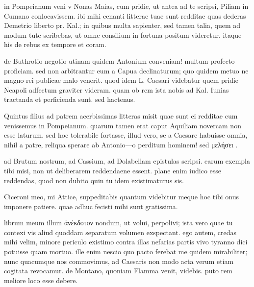 


 in Pompeianum veni v Nonas Maias, cum pridie, ut antea ad te scripsi, Piliam in Cumano conlocavissem. ibi mihi cenanti litterae tuae sunt redditae quas dederas Demetrio liberto pr. Kal.; in quibus multa sapienter, sed tamen talia, quem ad modum tute scribebas, ut omne consilium in fortuna positum videretur. itaque his de rebus ex tempore et coram.

 de Buthrotio negotio utinam quidem Antonium conveniam! multum profecto proficiam. sed non arbitrantur eum a Capua declinaturum; quo quidem metuo ne magno rei publicae malo venerit. quod idem L. Caesari videbatur quem pridie Neapoli adfectum graviter videram. quam ob rem ista nobis ad Kal. Iunias tractanda et perficienda sunt. sed hactenus.

 Quintus filius ad patrem acerbissimas litteras misit quae sunt ei redditae cum venissemus in Pompeianum. quarum tamen erat caput Aquiliam novercam non esse laturum. sed hoc tolerabile fortasse, illud vero, se a Caesare habuisse omnia, nihil a patre, reliqua sperare ab Antonio—o perditum hominem! sed μελήσει .

 ad Brutum nostrum, ad Cassium, ad Dolabellam epistulas scripsi. earum exempla tibi misi, non ut deliberarem reddendaene essent. plane enim iudico esse reddendas, quod non dubito quin tu idem existimaturus sis.

 Ciceroni meo, mi Attice, suppeditabis quantum videbitur meque hoc tibi onus imponere patiere. quae adhuc fecisti mihi sunt gratissima.

 librum meum illum ἀνέκδοτον nondum, ut volui, perpolivi; ista vero quae tu contexi vis aliud quoddam separatum volumen exspectant. ego autem, credas mihi velim, minore periculo existimo contra illas nefarias partis vivo tyranno dici potuisse quam mortuo. ille enim nescio quo pacto ferebat me quidem mirabiliter; nunc quacumque nos commovimus, ad Caesaris non modo acta verum etiam cogitata revocamur. de Montano, quoniam Flamma venit, videbis. puto rem meliore loco esse debere.
